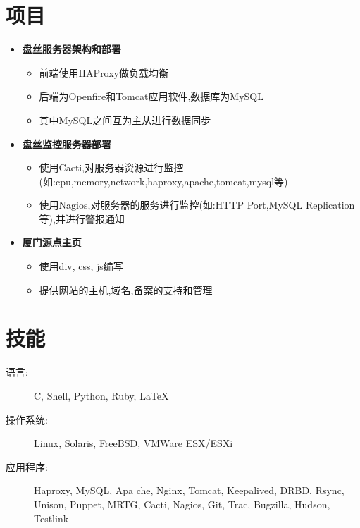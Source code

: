 \documentclass[11pt,letterpaper]{article}
\newcommand{\resitem}[1]{\item #1 \vspace{-2pt}}
\begin{document}
\begin{CJK}{UTF8}{gbsn}
\section{项目}  
	\begin{itemize}
		\item{\textbf{盘丝服务器架构和部署}}\vspace{-6pt}
			{\footnotesize
			\begin{itemize}
				\resitem{前端使用HAProxy做负载均衡}
				\resitem{后端为Openfire和Tomcat应用软件,数据库为MySQL}
				\resitem{其中MySQL之间互为主从进行数据同步}
			\end{itemize}
			} 
		\item{\textbf{盘丝监控服务器部署}}\vspace{-6pt}
			{\footnotesize
			\begin{itemize}
				\resitem{使用Cacti,对服务器资源进行监控(如:cpu,memory,network,haproxy,apache,tomcat,mysql等)}
				\resitem{使用Nagios,对服务器的服务进行监控(如:HTTP Port,MySQL Replication等),并进行警报通知}
			\end{itemize}
			} 
		\item{\textbf{厦门源点主页}}\vspace{-6pt}
			{\footnotesize
			\begin{itemize}
				\resitem{使用div, css, js编写}
				\resitem{提供网站的主机,域名,备案的支持和管理}
			\end{itemize}
			} 
	\end{itemize}

\section{技能}
	\begin{description}
		\item[语言:] { \footnotesize C, Shell, Python, Ruby, \LaTeX }
		\item[操作系统:] { \footnotesize Linux, Solaris, FreeBSD, VMWare ESX/ESXi }
		\item[应用程序:] { \footnotesize Haproxy, MySQL, Apa che, Nginx, Tomcat, Keepalived, DRBD, Rsync, Unison, Puppet, MRTG, Cacti, Nagios, Git, Trac, Bugzilla, Hudson, Testlink }
	\end{description}


\end{CJK} 
\end{document}
